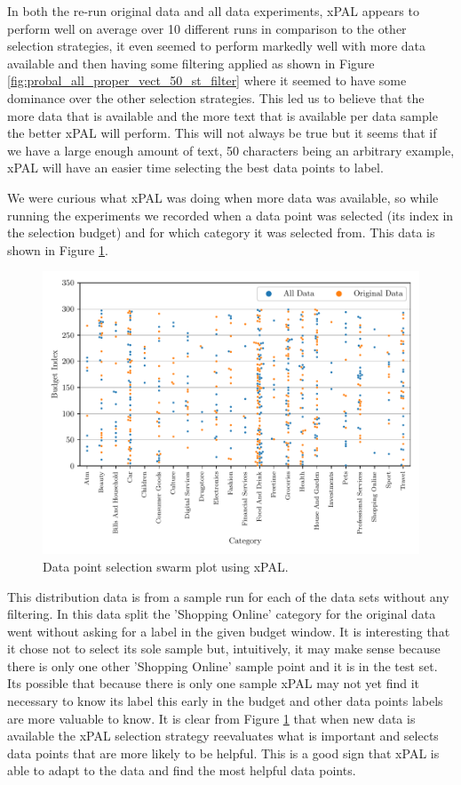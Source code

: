 In both the re-run original data and all data experiments, xPAL appears to perform well on average over 10 different runs in comparison to the other selection strategies, it even seemed to perform markedly well with more data available and then having some filtering applied as shown in Figure \ref{fig:probal_all_proper_vect_50_st_filter} where it seemed to have some dominance over the other selection strategies. This led us to believe that the more data that is available and the more text that is available per data sample the better xPAL will perform. This will not always be true but it seems that if we have a large enough amount of text, 50 characters being an arbitrary example, xPAL will have an easier time selecting the best data points to label.

We were curious what xPAL was doing when more data was available, so while running the experiments we recorded when a data point was selected (its index in the selection budget) and for which category it was selected from. This data is shown in Figure \ref{fig:xpal_data_selection}.

\begin{figure}[ht]
  \centering
  \includegraphics[width=\textwidth]{../img/plot_xpal_selection_dist}
  \caption{Data point selection swarm plot using xPAL.}
  \label{fig:xpal_data_selection}
\end{figure}

This distribution data is from a sample run for each of the data sets without any filtering. In this data split the 'Shopping Online' category for the original data went without asking for a label in the given budget window. It is interesting that it chose not to select its sole sample but, intuitively, it may make sense because there is only one other 'Shopping Online' sample point and it is in the test set. Its possible that because there is only one sample xPAL may not yet find it necessary to know its label this early in the budget and other data points labels are more valuable to know. It is clear from Figure \ref{fig:xpal_data_selection} that when new data is available the xPAL selection strategy reevaluates what is important and selects data points that are more likely to be helpful. This is a good sign that xPAL is able to adapt to the data and find the most helpful data points.

